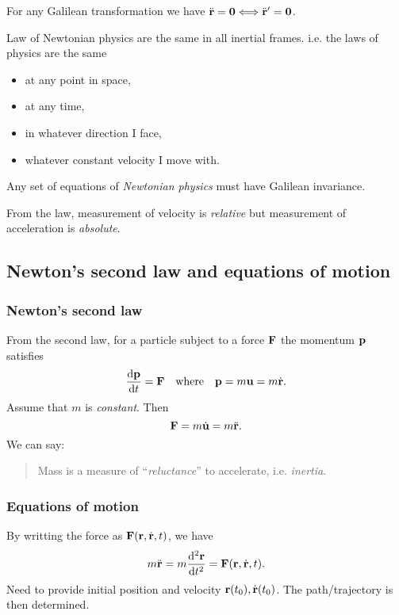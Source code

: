 \begin{note}
    For any Galilean transformation we have $ \ddot{{\bf r}}=\mathbf{0} \Longleftrightarrow \ddot{{\bf r}}'=\mathbf{0} $.
\end{note}

\begin{law}
    Law of Newtonian physics are the same in all inertial frames. i.e. the laws of physics are the same
    \begin{itemize}
        \item at any point in space,
        \item at any time,
        \item in whatever direction I face,
        \item whatever constant velocity I move with.
    \end{itemize}
    Any set of equations of \textit{Newtonian physics} must have Galilean invariance.
\end{law}

\begin{note}
    From the law, measurement of velocity is \textit{relative} but measurement of acceleration is \textit{absolute}.
\end{note}

\subsection{Newton's second law and equations of motion}
\subsubsection{Newton's second law}

From the second law, for a particle subject to a force ${\bf F}$ the momentum ${\bf p}$ satisfies
\[
    \frac{\mathrm{d}{\bf p}}{\mathrm{d}t} = {\bf F} \quad \text{where}\quad {\bf p}=m{\bf u}=m \dot{{\bf r}}. 
\]
Assume that $m$ is \textit{constant}. Then 
\[
    {\bf F} = m \dot{{\bf u}} = m \ddot{{\bf r}}.
\]
We can say: 
\begin{quote}
    Mass is a measure of ``\textit{reluctance}'' to accelerate, i.e. \textit{inertia}.
\end{quote}

\subsubsection{Equations of motion}
By writting the force as $ {\bf F}(\mathbf{r},\dot{{\bf r}},t) $, we have 
\[
    m \ddot{{\bf r}} = m \frac{\mathrm{d}^2 {\bf r}}{\mathrm{d}t^2} = {\bf F}({\bf r},\dot{{\bf r}},t). 
\]
Need to provide initial position and velocity $ \mathbf{r}(t_0),\dot{{\bf r}}(t_0) $. The path/trajectory is then determined.

